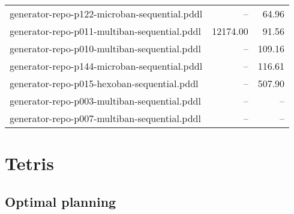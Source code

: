 \documentclass{article}
\begin{document}
\begin{center}
\begin{tabular}{@{}l|r|r@{}}
 generator-repo-p122-microban-sequential.pddl&--&64.96\\
 generator-repo-p011-multiban-sequential.pddl&12174.00&91.56\\
 generator-repo-p010-multiban-sequential.pddl&--&109.16\\
 generator-repo-p144-microban-sequential.pddl&--&116.61\\
 generator-repo-p015-hexoban-sequential.pddl&--&507.90\\
 generator-repo-p003-multiban-sequential.pddl&--&--\\
 generator-repo-p007-multiban-sequential.pddl&--&--
                            \end{tabular}
                            \end{center}
                    
                \newpage \section{Tetris}
                    \subsection*{Optimal planning}
                    
\end{document}
